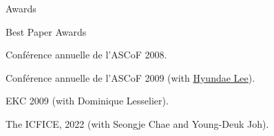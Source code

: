 \documentclass{resume} %
\begin{document}
\begin{rSection}{Awards}
\begin{rSubsection}{Best Paper Awards}{}{}{}
\item Conf\'erence annuelle de l'ASCoF 2008.
\item Conf\'erence annuelle de l'ASCoF 2009 (with \href{http://people.math.inha.ac.kr/~hdlee/}{Hyundae Lee}).%
\item EKC 2009 (with Dominique Lesselier).%
\item The  ICFICE, 2022 (with Seongje Chae and Young-Deuk Joh).%
\end{rSubsection}


\end{rSection}
\end{document}
